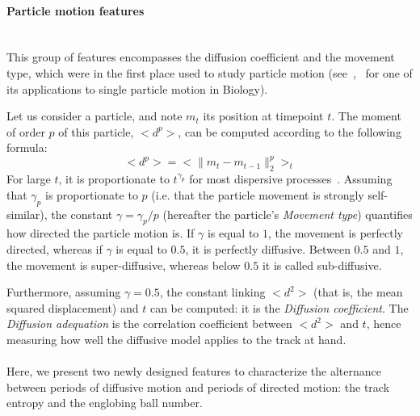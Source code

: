 \paragraph{Particle motion features}~\\ This group of features
encompasses the diffusion coefficient and the movement type, which
were in the first place used to study particle motion
(see~\cite{ferrari},~\cite{pmid16043363} for one of its applications to single particle motion in Biology).  

Let us consider a particle, and note $m_t$ its position at timepoint $t$. The moment of
order $p$ of this particle, $<d^p>$, can be computed according to the following formula: 
\[
<d^p>= < \|m_{t}-m_{t-1}\|_2^p >_t
\]
For large $t$, it is proportionate to $t^{\gamma_p}$ for
most dispersive processes~\cite{ferrari}. Assuming that $\gamma_p$ is
proportionate to $p$ (i.e. that the particle movement is strongly
self-similar), the constant $\gamma = \gamma_p /p$ (hereafter the particle's
\textit{Movement type}) quantifies how directed the particle motion is. If
$\gamma$ is equal to $1$, the movement is perfectly directed, whereas
if $\gamma$ is equal to $0.5$, it is perfectly diffusive. Between
$0.5$ and $1$, the movement is super-diffusive, whereas below $0.5$ it
is called sub-diffusive.  

Furthermore, assuming $ \gamma = 0.5 $, the constant linking $<d^2>$ (that is, the mean squared displacement) and $t$ can be computed: it is the \textit{Diffusion coefficient}. The \textit{Diffusion adequation} is the correlation coefficient between $<d^2>$ and $t$, hence measuring how well the diffusive model applies to the track at hand.
\paragraph*{}
Here, we present two newly designed features to characterize the
alternance between periods of diffusive motion and periods of directed
motion: the track entropy and the englobing ball number. 

